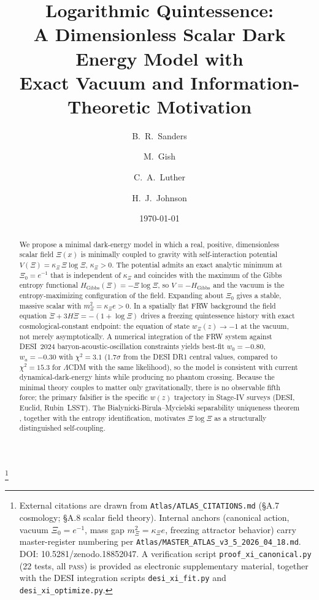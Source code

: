 \documentclass[11pt,reqno]{amsart}
\title[Logarithmic Quintessence with Exact Vacuum]{Logarithmic Quintessence:\\
A Dimensionless Scalar Dark Energy Model with\\
Exact Vacuum and Information-Theoretic Motivation}
\author{B.~R.~Sanders}
\author{M.~Gish}
\author{C.~A.~Luther}
\author{H.~J.~Johnson}
\date{\today}
\theoremstyle{plain}
\theoremstyle{definition}
\theoremstyle{remark}
\newcommand{\Gibbs}{\mathrm{Gibbs}}
\begin{document}
\begin{abstract}
We propose a minimal dark-energy model in which a real, positive, dimensionless
scalar field $\Xi(x)$ is minimally coupled to gravity with self-interaction
potential $V(\Xi)=\kappa_\Xi\,\Xi\log\Xi$, $\kappa_\Xi>0$. The potential admits
an exact analytic minimum at $\Xi_0=e^{-1}$ that is independent of $\kappa_\Xi$
and coincides with the maximum of the Gibbs entropy functional
$H_{\Gibbs}(\Xi)=-\Xi\log\Xi$, so $V=-H_{\Gibbs}$ and the vacuum is the
entropy-maximizing configuration of the field. Expanding about $\Xi_0$ gives
a stable, massive scalar with $m_\Xi^{2}=\kappa_\Xi e>0$. In a spatially flat
FRW background the field equation $\ddot{\Xi}+3H\dot{\Xi}=-(1+\log\Xi)$ drives
a freezing quintessence history with exact cosmological-constant endpoint:
the equation of state $w_\Xi(z)\to -1$ at the vacuum, not merely asymptotically.
A numerical integration of the FRW system against DESI~2024 baryon-acoustic-oscillation
constraints yields best-fit $w_0=-0.80$, $w_a=-0.30$ with $\chi^{2}=3.1$
(1.7$\sigma$ from the DESI DR1 central values, compared to $\chi^{2}=15.3$ for
$\Lambda$CDM with the same likelihood), so the model is consistent with current
dynamical-dark-energy hints while producing no phantom crossing. Because the
minimal theory couples to matter only gravitationally, there is no observable
fifth force; the primary falsifier is the specific $w(z)$ trajectory in Stage-IV
surveys (DESI, Euclid, Rubin~LSST). The Bialynicki-Birula--Mycielski
separability uniqueness theorem \cite{BialynickiBirulaMycielski1976}, together
with the entropy identification, motivates $\Xi\log\Xi$ as a structurally
distinguished self-coupling.
\end{abstract}

\footnote{External citations are drawn from \texttt{Atlas/ATLAS\_CITATIONS.md}
(\S A.7 cosmology; \S A.8 scalar field theory). Internal anchors
(canonical action, vacuum $\Xi_0=e^{-1}$, mass gap $m^{2}_\Xi=\kappa_\Xi e$,
freezing attractor behavior) carry master-register numbering per
\texttt{Atlas/MASTER\_ATLAS\_v3\_5\_2026\_04\_18.md}. DOI: 10.5281/zenodo.18852047.
A verification script \texttt{proof\_xi\_canonical.py} (22 tests, all
\textsc{pass}) is provided as electronic supplementary material, together
with the DESI integration scripts \texttt{desi\_xi\_fit.py} and
\texttt{desi\_xi\_optimize.py}.}

\maketitle
\end{document}
